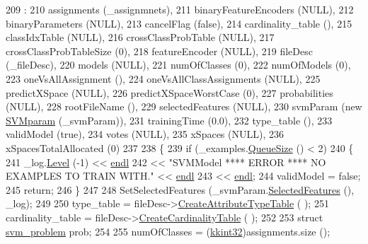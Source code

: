 \begin{DoxyCode}
209 :
210   assignments              (\_assignmnets),
211   binaryFeatureEncoders    (NULL),
212   binaryParameters         (NULL),
213   cancelFlag               (\textcolor{keyword}{false}),
214   cardinality\_table        (),
215   classIdxTable            (NULL),
216   crossClassProbTable      (NULL),
217   crossClassProbTableSize  (0),
218   featureEncoder           (NULL),
219   fileDesc                 (\_fileDesc),
220   models                   (NULL),
221   numOfClasses             (0),
222   numOfModels              (0),
223   oneVsAllAssignment       (),
224   oneVsAllClassAssignments (NULL),
225   predictXSpace            (NULL),
226   predictXSpaceWorstCase   (0),
227   probabilities            (NULL),
228   rootFileName             (),
229   selectedFeatures         (NULL),
230   svmParam                 (\textcolor{keyword}{new} \hyperlink{class_k_k_m_l_l_1_1_s_v_mparam}{SVMparam} (\_svmParam)),
231   trainingTime             (0.0),
232   type\_table               (),
233   validModel               (\textcolor{keyword}{true}),
234   votes                    (NULL),
235   xSpaces                  (NULL),
236   xSpacesTotalAllocated    (0)
237 
238 \{
239   \textcolor{keywordflow}{if}  (\_examples.\hyperlink{class_k_k_b_1_1_k_k_queue_a1dab601f75ee6a65d97f02bddf71c40d}{QueueSize} () < 2)
240   \{
241     \_log.\hyperlink{class_k_k_b_1_1_run_log_a32cf761d7f2e747465fd80533fdbb659}{Level} (-1) << \hyperlink{namespace_k_k_b_ad1f50f65af6adc8fa9e6f62d007818a8}{endl}
242                     << \textcolor{stringliteral}{"SVMModel  **** ERROR ****      NO EXAMPLES TO TRAIN WITH."} << 
      \hyperlink{namespace_k_k_b_ad1f50f65af6adc8fa9e6f62d007818a8}{endl}
243                     << \hyperlink{namespace_k_k_b_ad1f50f65af6adc8fa9e6f62d007818a8}{endl};
244     validModel = \textcolor{keyword}{false};
245     \textcolor{keywordflow}{return};
246   \}
247 
248   SetSelectedFeatures (\_svmParam.\hyperlink{class_k_k_m_l_l_1_1_s_v_mparam_a52c95a964ff1638bb24289967937b29b}{SelectedFeatures} (), \_log);
249 
250   type\_table        = fileDesc->\hyperlink{class_k_k_m_l_l_1_1_file_desc_a924736ac68c054c64001fe836ba7c1e3}{CreateAttributeTypeTable} ( );
251   cardinality\_table = fileDesc->\hyperlink{class_k_k_m_l_l_1_1_file_desc_a1f16b3ad912b04745baa9eea8d3111c7}{CreateCardinalityTable} ( );
252   
253   \textcolor{keyword}{struct }\hyperlink{struct_s_v_m233_1_1svm__problem}{svm\_problem}  prob;
254 
255   numOfClasses = (\hyperlink{namespace_k_k_b_a8fa4952cc84fda1de4bec1fbdd8d5b1b}{kkint32})assignments.size ();

\end{DoxyCode}
